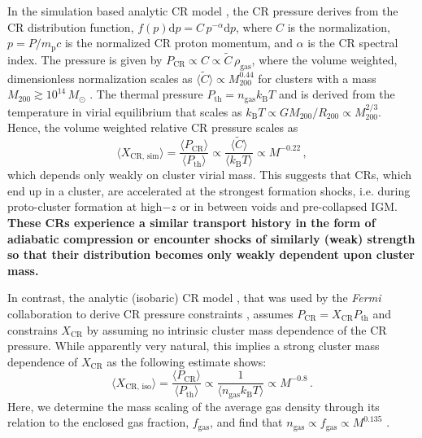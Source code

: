 \documentclass[10pt,aps,pra,reprint,amsmath,amsfonts,amssymb,showpacs,nofootinbib,floatfix]{revtex4-1}
\def\C#1{{\bf #1}}
\newcommand{\Fermi}{{\em Fermi}\xspace}
\newcommand{\rmn}{\mathrm}
\newcommand{\msun}{M_\odot}
\newcommand{\B}{\rmn{B}}
\newcommand{\bra}{\langle}
\newcommand{\ket}{\rangle}
\newcommand{\dd}{\rmn{d}}
\newcommand{\CR}{\rmn{CR}}
\newcommand{\mvir}{M_{200}}
\begin{document}
In the simulation based analytic CR model \cite{2010MNRAS.409..449P},
the CR pressure derives from the CR distribution function, $f(p)\dd p =
C\,p^{-\alpha}\dd p$, where $C$ is the normalization, $p=P/m_\rmn{p}
c$ is the normalized CR proton momentum, and $\alpha$ is the CR
spectral index. The pressure is given by $P_\CR \propto C\propto
\tilde{C} \,\rho_\rmn{gas}$, where the volume weighted, dimensionless
normalization scales as $\bra\tilde{C}\ket\propto \mvir^{0.44}$ for clusters
with a mass $\mvir\gtrsim 10^{14}\,\msun$
\cite{2010MNRAS.409..449P}. The thermal pressure $P_\rmn{th} =
n_\rmn{gas} k_\B T$ and is derived from the temperature in virial
equilibrium that scales as $k_\B T \propto G \mvir/R_{200} \propto
\mvir^{2/3}$. Hence, the volume weighted relative CR pressure scales
as
\begin{equation}
    \bra X_{\CR,\,\rmn{sim}}\ket = \frac{\bra P_\CR\ket}{\bra
      P_\rmn{th}\ket} \propto \frac{\bra\tilde{C}\ket}{\bra k_\B
      T\ket} \propto M^{-0.22}\,,
\end{equation}
which depends only weakly on cluster virial mass. This suggests that
CRs, which end up in a cluster, are accelerated at the strongest
formation shocks, i.e. during proto-cluster formation at high$-z$ or
in between voids and pre-collapsed IGM. \C{These CRs experience a
similar transport history in the form of adiabatic compression or
encounter shocks of similarly (weak) strength so that their
distribution becomes only weakly dependent upon cluster mass.}

In contrast, the analytic (isobaric) CR model
\cite{2004A&A...413...17P}, that was used by the \Fermi collaboration
to derive CR pressure constraints \cite{2010ApJ...717L..71A}, assumes
$P_\CR = X_\CR P_\rmn{th}$ and constrains $X_\CR$ by assuming no
intrinsic cluster mass dependence of the CR pressure.  While
apparently very natural, this implies a strong cluster mass dependence
of $X_\CR$ as the following estimate shows:
\begin{equation}
    \bra X_{\CR,\,\rmn{iso}}\ket = \frac{\bra P_\CR\ket}{\bra P_\rmn{th}\ket} 
    \propto \frac{1}{\bra n_\rmn{gas} k_\B T\ket} \propto M^{-0.8}\,.
\end{equation}
Here, we determine the mass scaling of the average gas density through
its relation to the enclosed gas fraction, $f_\rmn{gas}$, and find
that $n_\rmn{gas}\propto f_\rmn{gas} \propto M^{0.135}$
\cite{2009ApJ...693.1142S}.
\end{document}
